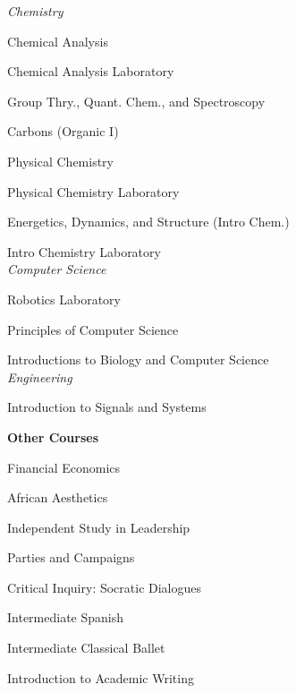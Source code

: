 \documentclass[9pt]{article}
\begin{document}
\begin{multicols}{2}
\vspace{3mm}
\noindent
{\it Chemistry} \\
\par Chemical Analysis \\
\par Chemical Analysis Laboratory \\
\par Group Thry., Quant. Chem., and Spectroscopy \\
\par Carbons (Organic I) \\
\par Physical Chemistry \\ 
\par Physical Chemistry Laboratory \\
\par Energetics, Dynamics, and Structure (Intro Chem.) \\
\par Intro Chemistry Laboratory \\

\vspace{3mm}
\noindent
{\it Computer Science} \\
\par Robotics Laboratory \\
\par Principles of Computer Science \\
\par Introductions to Biology and Computer Science \\

\vspace{3mm}
\noindent
{\it Engineering} \\
\par Introduction to Signals and Systems \\

\end{multicols}

\noindent
{\bf Other Courses \\}
\setlength{\parindent}{5mm}
\setlength{\parskip}{-5.5mm}
\par Financial Economics \\
\par African Aesthetics \\
\par Independent Study in Leadership \\
\par Parties and Campaigns \\
\par Critical Inquiry: Socratic Dialogues \\
\par Intermediate Spanish \\
\par Intermediate Classical Ballet \\
\par Introduction to Academic Writing \\
\end{document}

